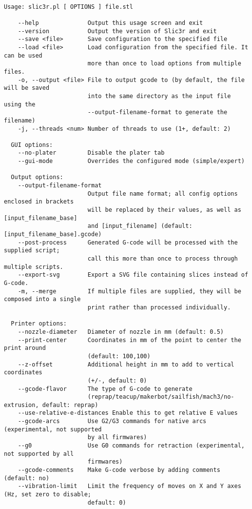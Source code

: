 \tiny
\begin{verbatim}

Usage: slic3r.pl [ OPTIONS ] file.stl

    --help              Output this usage screen and exit
    --version           Output the version of Slic3r and exit
    --save <file>       Save configuration to the specified file
    --load <file>       Load configuration from the specified file. It can be used
                        more than once to load options from multiple files.
    -o, --output <file> File to output gcode to (by default, the file will be saved
                        into the same directory as the input file using the
                        --output-filename-format to generate the filename)
    -j, --threads <num> Number of threads to use (1+, default: 2)

  GUI options:
    --no-plater         Disable the plater tab
    --gui-mode          Overrides the configured mode (simple/expert)

  Output options:
    --output-filename-format
                        Output file name format; all config options enclosed in brackets
                        will be replaced by their values, as well as [input_filename_base]
                        and [input_filename] (default: [input_filename_base].gcode)
    --post-process      Generated G-code will be processed with the supplied script;
                        call this more than once to process through multiple scripts.
    --export-svg        Export a SVG file containing slices instead of G-code.
    -m, --merge         If multiple files are supplied, they will be composed into a single
                        print rather than processed individually.

  Printer options:
    --nozzle-diameter   Diameter of nozzle in mm (default: 0.5)
    --print-center      Coordinates in mm of the point to center the print around
                        (default: 100,100)
    --z-offset          Additional height in mm to add to vertical coordinates
                        (+/-, default: 0)
    --gcode-flavor      The type of G-code to generate 
                        (reprap/teacup/makerbot/sailfish/mach3/no-extrusion, default: reprap)
    --use-relative-e-distances Enable this to get relative E values
    --gcode-arcs        Use G2/G3 commands for native arcs (experimental, not supported
                        by all firmwares)
    --g0                Use G0 commands for retraction (experimental, not supported by all
                        firmwares)
    --gcode-comments    Make G-code verbose by adding comments (default: no)
    --vibration-limit   Limit the frequency of moves on X and Y axes (Hz, set zero to disable;
                        default: 0)


\end{verbatim}
